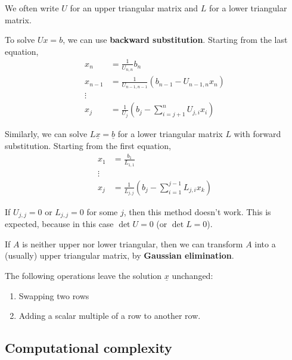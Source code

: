 \begin{remark}
	We often write $U$ for an upper triangular matrix and $L$ for a lower triangular matrix.
\end{remark}

\begin{definition}
	To solve $Ux = b$, we can use \textbf{backward substitution}. Starting from the last equation,
	\[
		\begin{aligned}
			x_n & = \frac{1}{U_{n, n}} b_n \\
			x_{n - 1} & = \frac{1}{U_{n - 1, n - 1}} (b_{n - 1} - U_{n - 1, n} x_n) \\
			\vdots & \\
			x_j & = \frac{1}{U_j} \left( b_j - \sum_{i = j + 1}^{n} U_{j, i} x_i \right)
		\end{aligned}
	\]
\end{definition}

\begin{definition}
	Similarly, we can solve $L \underline{x} = \underline{b}$ for a lower triangular matrix $L$ with forward substitution. Starting from the first equation,
	\[
		\begin{aligned}
			x_1 & = \frac{b_1}{L_{1, 1}} \\
			\vdots & \\
			x_j & = \frac{1}{L_{j, j}} \left( b_j - \sum_{i = 1}^{j - 1} L_{j, i} x_k \right)
		\end{aligned}
	\]
\end{definition}

\begin{remark}
	If $U_{j, j} = 0$ or $L_{j, j} = 0$ for some $j$, then this method doesn't work. This is expected, because in this case $\det U = 0$ (or $\det L = 0$).
\end{remark}

\begin{definition}
	If $A$ is neither upper nor lower triangular, then we can transform $A$ into a (usually) upper triangular matrix, by \textbf{Gaussian elimination}.

	The following operations leave the solution $\underline{x}$ unchanged:
	\begin{enumerate}
		\item Swapping two rows
		\item Adding a scalar multiple of a row to another row.
	\end{enumerate}
\end{definition}

\subsection{Computational complexity}

